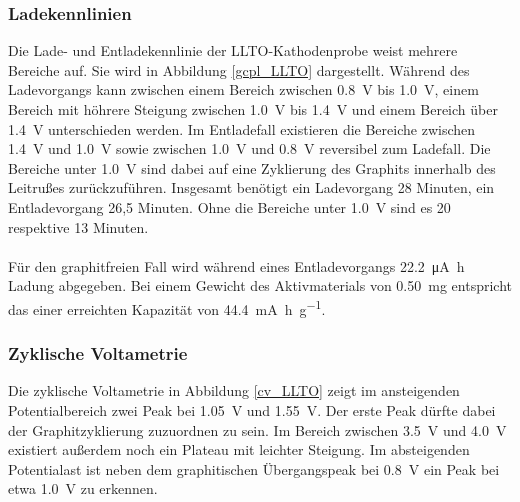\documentclass[a4paper, 11pt, headsepline,footsepline,twoside,abstract]{scrbook}
\begin{document}
\subsubsection{Ladekennlinien}
Die Lade- und Entladekennlinie der LLTO-Kathodenprobe weist mehrere Bereiche auf. Sie wird in Abbildung \ref{gcpl_LLTO} dargestellt. Während des Ladevorgangs kann zwischen einem Bereich zwischen \SI{0.8}{\volt} bis \SI{1.0}{\volt}, einem Bereich mit höhrere Steigung zwischen \SI{1.0}{\volt} bis \SI{1.4}{\volt} und einem Bereich über \SI{1.4}{\volt} unterschieden werden. Im Entladefall existieren die Bereiche zwischen \SI{1.4}{\volt} und \SI{1.0}{\volt} sowie zwischen \SI{1.0}{\volt} und \SI{0.8}{\volt} reversibel zum Ladefall. Die Bereiche unter \SI{1.0}{\volt} sind dabei auf eine Zyklierung des Graphits innerhalb des Leitrußes zurückzuführen. Insgesamt benötigt ein Ladevorgang 28 Minuten, ein Entladevorgang 26,5 Minuten. Ohne die Bereiche unter \SI{1.0}{\volt} sind es 20 respektive 13 Minuten.
\\\\
Für den graphitfreien Fall  wird während eines Entladevorgangs \SI{22.2}{\micro\ampere\hour} Ladung abgegeben. Bei einem Gewicht des Aktivmaterials von \SI{0.50}{\milli\gram} entspricht das einer erreichten Kapazität von \SI{44.4}{\milli\ampere\hour\per\gram}.
\subsubsection{Zyklische Voltametrie}
Die zyklische Voltametrie in Abbildung \ref{cv_LLTO} zeigt im ansteigenden Potentialbereich zwei Peak bei \SI{1.05}{\volt} und \SI{1.55}{\volt}. Der erste Peak dürfte dabei der Graphitzyklierung zuzuordnen zu sein.  Im Bereich zwischen \SI{3.5}{\volt} und \SI{4.0}{\volt} existiert außerdem noch ein Plateau mit leichter Steigung. Im absteigenden Potentialast ist neben dem graphitischen Übergangspeak bei \SI{0.8}{\volt} ein Peak bei etwa \SI{1.0}{\volt} zu erkennen.
\end{document}
